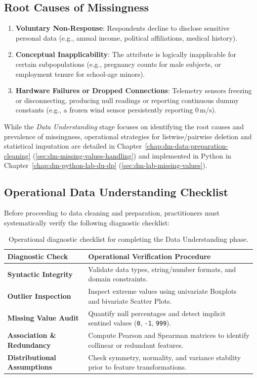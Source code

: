 \subsection{Root Causes of Missingness}
\begin{enumerate}
    \item \textbf{Voluntary Non-Response}: Respondents decline to disclose sensitive personal data (e.g., annual income, political affiliations, medical history).
    \item \textbf{Conceptual Inapplicability}: The attribute is logically inapplicable for certain subpopulations (e.g., pregnancy counts for male subjects, or employment tenure for school-age minors).
    \item \textbf{Hardware Failures or Dropped Connections}: Telemetry sensors freezing or disconnecting, producing null readings or reporting continuous dummy constants (e.g., a frozen wind sensor persistently reporting $0\,\text{m/s}$).
\end{enumerate}

While the \textit{Data Understanding} stage focuses on identifying the root causes and prevalence of missingness, operational strategies for listwise/pairwise deletion and statistical imputation are detailed in Chapter~\ref{chap:dm-data-preparation-cleaning} (\autoref{sec:dm-missing-values-handling}) and implemented in Python in Chapter~\ref{chap:dm-python-lab-du-dp} (\autoref{sec:dm-lab-missing-values}).

\subsection{Operational Data Understanding Checklist}

Before proceeding to data cleaning and preparation, practitioners must systematically verify the following diagnostic checklist:

\begin{table}[htbp]
    \centering
    \small
    \begin{tabularx}{\textwidth}{lX}
        \toprule
        \textbf{Diagnostic Check} & \textbf{Operational Verification Procedure} \\
        \midrule
        \textbf{Syntactic Integrity} & Validate data types, string/number formats, and domain constraints. \\
        \textbf{Outlier Inspection} & Inspect extreme values using univariate Boxplots and bivariate Scatter Plots. \\
        \textbf{Missing Value Audit} & Quantify null percentages and detect implicit sentinel values (\texttt{0}, \texttt{-1}, \texttt{999}). \\
        \textbf{Association \& Redundancy} & Compute Pearson and Spearman matrices to identify collinear or redundant features. \\
        \textbf{Distributional Assumptions} & Check symmetry, normality, and variance stability prior to feature transformations. \\
        \bottomrule
    \end{tabularx}
    \caption{Operational diagnostic checklist for completing the Data Understanding phase.}
    \label{tab:dm-du-checklist}
\end{table}
